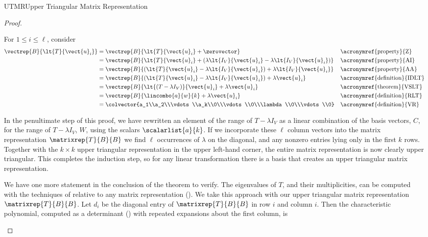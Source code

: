 \begin{subsect}{UTMR}{Upper Triangular Matrix Representation}
\begin{proof}
\begin{para}For $1\leq i\leq\ell$, consider
%
\begin{align*}
\vectrep{B}{\lt{T}{\vect{u}_i}}
&=\vectrep{B}{\lt{T}{\vect{u}_i}+\zerovector}&&\text{\acronymref{property}{Z}}\\
%
&=\vectrep{B}{\lt{T}{\vect{u}_i}+\left(\lambda\lt{I_V}{\vect{u}_i}-\lambda\lt{I_V}{\vect{u}_i}\right)}&&\text{\acronymref{property}{AI}}\\
%
&=\vectrep{B}{\left(\lt{T}{\vect{u}_i}-\lambda\lt{I_V}{\vect{u}_i}\right)+\lambda\lt{I_V}{\vect{u}_i}}&&\text{\acronymref{property}{AA}}\\
%
&=\vectrep{B}{\left(\lt{T}{\vect{u}_i}-\lambda\lt{I_V}{\vect{u}_i}\right)+\lambda\vect{u}_i}&&\text{\acronymref{definition}{IDLT}}\\
%
&=\vectrep{B}{\lt{\left(T-\lambda I_V\right)}{\vect{u}_i}+\lambda\vect{u}_i}
&&\text{\acronymref{theorem}{VSLT}}\\
%
&=\vectrep{B}{\lincombo{a}{w}{k}+\lambda\vect{u}_i}
&&\text{\acronymref{definition}{RLT}}\\
%
&=\colvector{a_1\\a_2\\\vdots\\a_k\\0\\\vdots\\0\\\lambda\\0\\\vdots\\0}
&&\text{\acronymref{definition}{VR}}
%
\end{align*}
\end{para}
%
\begin{para}In the penultimate step of this proof, we have rewritten an element of the range of $T-\lambda I_V$ as a linear combination of the basis vectors, $C$, for the range of $T-\lambda I_V$, $W$, using the scalars $\scalarlist{a}{k}$.  If we incorporate these $\ell$ column vectors into the matrix representation $\matrixrep{T}{B}{B}$ we find $\ell$ occurrences of $\lambda$ on the diagonal, and any nonzero entries lying only in the first $k$ rows.  Together with the $k\times k$ upper triangular representation in the upper left-hand corner, the entire matrix representation is now clearly upper triangular.  This completes the induction step, so for any linear transformation there is a basis that creates an upper triangular matrix representation.\end{para}
%
\begin{para}We have one more statement in the conclusion of the theorem to verify.  The eigenvalues of $T$, and their multiplicities, can be computed with the techniques of  relative to any matrix representation (). We take this approach with our upper triangular matrix representation $\matrixrep{T}{B}{B}$.  Let $d_i$ be the diagonal entry of $\matrixrep{T}{B}{B}$ in row $i$ and column $i$.  Then the characteristic polynomial, computed as a determinant () with repeated expansions about the first column, is

\end{para}
\end{proof}
\end{subsect}
